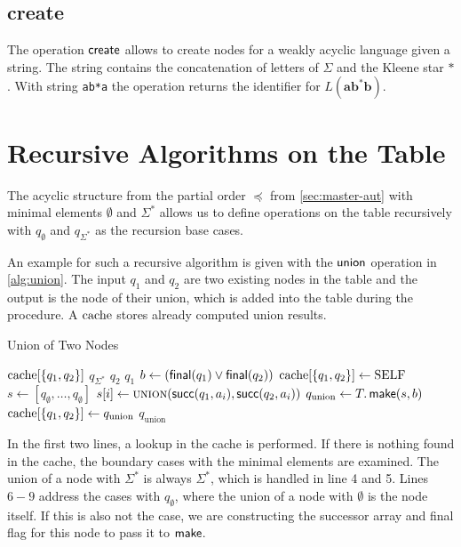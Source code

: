 \subsection{create}
The operation $\operatorname{\textsf{create}}$ allows to create nodes for a weakly acyclic language given a string. The string contains the concatenation of letters of $\Sigma$ and the Kleene star $*$. With string \texttt{ab*a} the operation returns the identifier for $L(\bm{ab^{*}b})$.



\section{Recursive Algorithms on the Table}
The acyclic structure from the partial order $\preceq$ from \autoref{sec:master-aut} with minimal elements $\emptyset$ and $\Sigma^{*}$ allows us to define operations on the table recursively with $q_{\emptyset}$ and $q_{\Sigma^{*}}$ as the recursion base cases.
\par
An example for such a recursive algorithm is given with the $\operatorname{\textsf{union}}$ operation in \autoref{alg:union}. The input $q_{1}$ and $q_{2}$ are two existing nodes in the table and the output is the node of their union, which is added into the table during the procedure. A $\mathrm{cache}$ stores already computed union results.
\begin{algorithm}[htb]
\caption{Union of Two Nodes}\label{alg:union}
\begin{algorithmic}[1]
\If{$\cache[\{q_{1},q_{2}\}]$}
	\Return $\cache[\{q_{1},q_{2}\}]$
	\Return $q_{\Sigma^{*}}$
	\Return $q_{2}$
	\Return $q_{1}$
\EndIf
\State $b \gets (\operatorname{\textsf{final}}(q_{1}) \lor \operatorname{\textsf{final}}(q_{2}))$
\State $\mathrm{cache}[\{q_{1},q_{2}\}] \gets \text{SELF}$
\State $s \gets [q_{\emptyset},\dots,q_{\emptyset}]$
\State $s[i] \gets \Call{union}{\Succ(q_{1},a_{i}),\Succ(q_{2},a_{i})}$
\EndFor
\State $q_{\text{union}} \gets T.\operatorname{\textsf{make}}(s,b)$
\State $\mathrm{cache}[\{q_{1},q_{2}\}] \gets q_{\text{union}}$
\Return $q_{\text{union}}$
\EndProcedure
\end{algorithmic}
\end{algorithm}
In the first two lines, a lookup in the cache is performed. If there is nothing found in the cache, the boundary cases with the minimal elements are examined. The union of a node with $\Sigma^{*}$ is always $\Sigma^{*}$, which is handled in line 4 and 5. Lines $6-9$ address the cases with $q_{\emptyset}$, where the union of a node with $\emptyset$ is the node itself. 
If this is also not the case, we are constructing the successor array and final flag for this node to pass it to $\operatorname{\textsf{make}}$. 


